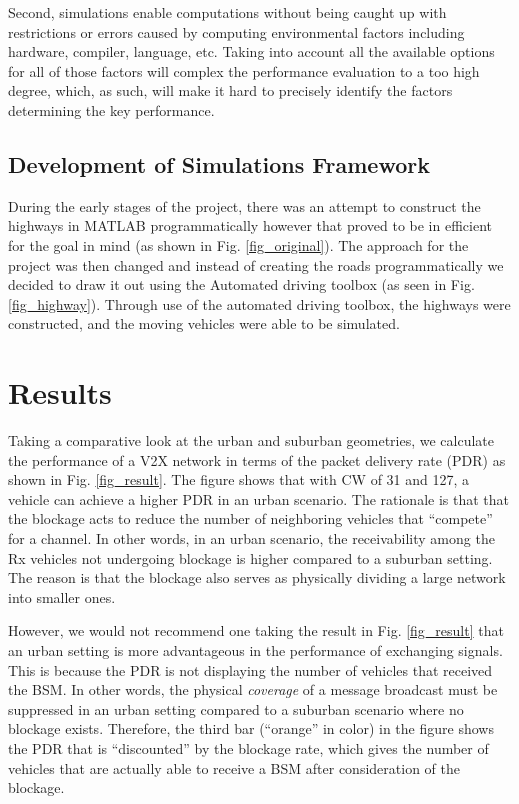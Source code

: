 \documentclass[journal]{IEEEtran}
\begin{document}
Second, simulations enable computations without being caught up with restrictions or errors caused by computing environmental factors including hardware, compiler, language, etc. Taking into account all the available options for all of those factors will complex the performance evaluation to a too high degree, which, as such, will make it hard to precisely identify the factors determining the key performance.

\subsection{Development of Simulations Framework}
During the early stages of the project, there was an attempt to construct the highways in MATLAB programmatically however that proved to be in efficient for the goal in mind (as shown in Fig. \ref{fig_original}). The approach for the project was then changed and instead of creating the roads programmatically we decided to draw it out using the Automated driving toolbox (as seen in Fig. \ref{fig_highway}). Through use of the automated driving toolbox, the highways were constructed, and the moving vehicles were able to be simulated.



\section{Results}
Taking a comparative look at the urban and suburban geometries, we calculate the performance of a V2X network in terms of the packet delivery rate (PDR) as shown in Fig. \ref{fig_result}. The figure shows that with CW of 31 and 127, a vehicle can achieve a higher PDR in an urban scenario. The rationale is that that the blockage acts to reduce the number of neighboring vehicles that ``compete'' for a channel. In other words, in an urban scenario, the receivability among the Rx vehicles not undergoing blockage is higher compared to a suburban setting. The reason is that the blockage also serves as physically dividing a large network into smaller ones.

However, we would not recommend one taking the result in Fig. \ref{fig_result} that an urban setting is more advantageous in the performance of exchanging signals. This is because the PDR is not displaying the number of vehicles that received the BSM. In other words, the physical \textit{coverage} of a message broadcast must be suppressed in an urban setting compared to a suburban scenario where no blockage exists. Therefore, the third bar (``orange'' in color) in the figure shows the PDR that is ``discounted'' by the blockage rate, which gives the number of vehicles that are actually able to receive a BSM after consideration of the blockage.
\end{document}
